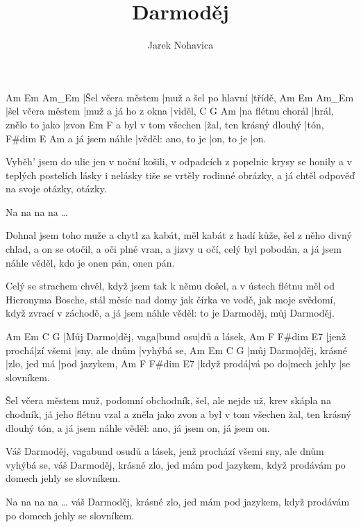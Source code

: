 \documentclass{song}
\author{Jarek Nohavica}
\title{Darmoděj}
\begin{document}
\begin{multicols}{2}

\strophe
Am                Em                   Am_Em
|Šel včera městem |muž a šel po hlavní |třídě,
Am                Em                  Am_Em
|šel včera městem |muž a já ho z okna |viděl,
C                 G                    Am
|na flétnu chorál |hrál, znělo to jako |zvon
                    Em                      F
a byl v tom všechen |žal, ten krásný dlouhý |tón,
                F#dim              E          Am
a já jsem náhle |věděl: ano, to je |on, to je |on.
\endstrophe

\strophe*
Vyběh' jsem do ulic jen v noční košili,
v odpadcích z popelnic krysy se honily
a v teplých postelích lásky i nelásky
tiše se vrtěly rodinné obrázky,
a já chtěl odpověď na svoje otázky, otázky.
\endstrophe

Na na na na \ldots
\endstrophe

\strophe*
Dohnal jsem toho muže a chytl za kabát,
měl kabát z hadí kůže, šel z něho divný chlad,
a on se otočil, a oči plné vran,
a jizvy u očí, celý byl pobodán,
a já jsem náhle věděl, kdo je onen pán, onen pán.
\endstrophe

\strophe*
Celý se strachem chvěl, když jsem tak k němu došel,
a v ústech flétnu měl od Hieronyma Bosche,
stál měsíc nad domy jak čírka ve vodě,
jak moje svědomí, když zvrací v záchodě,
a já jsem náhle věděl: to je Darmoděj, můj Darmoděj.
\endstrophe

\columnbreak

Am        Em        C        G
|Můj Darmo|děj, vaga|bund osu|dů a lásek,
Am          F         F#dim          E7
|jenž prochá|zí všemi |sny, ale dnům |vyhýbá se,
Am        Em           C            G
|můj Darmo|děj, krásné |zlo, jed má |pod jazykem,
Am         F        F#dim       E7
|když prodá|vá po do|mech jehly |se slovníkem.
\endstrophe

\strophe*
Šel včera městem muž, podomní obchodník,
šel, ale nejde už, krev skápla na chodník,
já jeho flétnu vzal a zněla jako zvon
a byl v tom všechen žal, ten krásný dlouhý tón,
a já jsem náhle věděl: ano, já jsem on, já jsem on.
\endstrophe

Váš Darmoděj, vagabund osudů a lásek,
jenž prochází všemi sny, ale dnům vyhýbá se,
váš Darmoděj, krásné zlo, jed mám pod jazykem,
když prodávám po domech jehly se slovníkem.
\endstrophe

Na na na na \ldots
váš Darmoděj, krásné zlo, jed mám pod jazykem,
když prodávám po domech jehly se slovníkem.
\endstrophe

\end{multicols}
\end{document}
